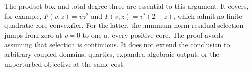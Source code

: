 The product box and total degree three are essential to this argument.
It covers, for example, $F(v,z)=vz^2$ and
$F(v,z)=v^2(2-z)$, which admit no finite quadratic core convexifier.
For the latter, the minimum-norm residual selection jumps from zero at
$v=0$ to one at every positive core. The proof avoids assuming that
selection is continuous. It does not extend the conclusion to arbitrary
coupled domains, quartics, expanded algebraic output, or the
unperturbed objective at the same cost.
